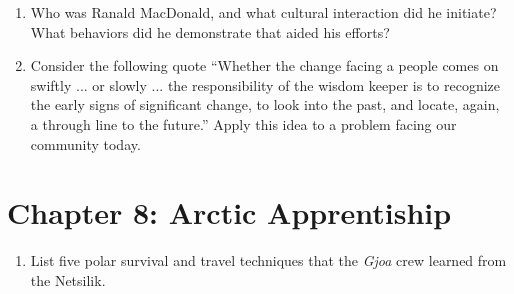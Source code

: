 \documentclass{article}
\begin{document}
\begin{enumerate}
\item Who was Ranald MacDonald, and what cultural interaction did he initiate? What behaviors did he demonstrate that aided his efforts? \\ \vspace{2cm}
\item Consider the following quote ``Whether the change facing a people comes on swiftly ... or slowly ... the responsibility of the wisdom keeper is to recognize the early signs of significant change, to look into the past, and locate, again, a through line to the future.'' Apply this idea to a problem facing our community today. \\ \vspace{3cm}
\end{enumerate}

\section{Chapter 8: Arctic Apprentiship}

\begin{enumerate}
\item List five polar survival and travel techniques that the \textit{Gjoa} crew learned from the Netsilik.
\end{enumerate}
\end{document}
